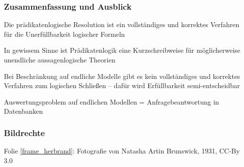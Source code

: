 \documentclass[onlymath]{beamer}
\begin{document}
\begin{frame}\frametitle{Zusammenfassung und Ausblick}

Die prädikatenlogische Resolution ist ein vollständiges und korrektes Verfahren für die Unerfüllbarkeit logischer Formeln\bigskip

In gewissem Sinne ist Prädikatenlogik eine Kurzschreibweise für möglicherweise unendliche aussagenlogische Theorien
\bigskip

Bei Beschränkung auf endliche Modelle gibt es kein vollständiges und korrektes Verfahren zum logischen Schließen -- dafür wird Erfüllbarkeit semi-entscheidbar\bigskip

Auswertungsproblem auf endlichen Modellen = Anfragebeantwortung in Datenbanken


\end{frame}


\begin{frame}[t]\frametitle{Bildrechte}

Folie \ref{frame_herbrand}: Fotografie von Natasha Artin Brunswick, 1931, CC-By 3.0

\end{frame}
\end{document}
